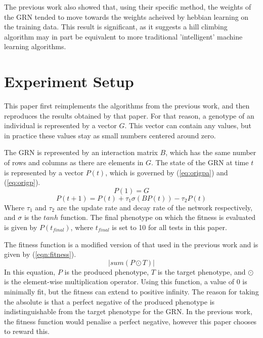 \documentclass[twocolumn,a4paper]{article}
\begin{document}
    The previous work also showed that, using their specific method, the weights of the GRN tended to move towards the weights acheived by hebbian learning on the training data. This result is significant, as it suggests a hill climbing algorithm may in part be equivalent to more traditional 'intelligent' machine learning algorithms.

    \section{Experiment Setup}
    This paper first reimplements the algorithms from the previous work, and then reproduces the results obtained by that paper. For that reason, a genotype of an individual is represented by a vector $G$. This vector can contain any values, but in practice these values stay as small numbers centered around zero.
    
    The GRN is represented by an interaction matrix $B$, which has the same number of rows and columns as there are elements in $G$. The state of the GRN at time $t$ is represented by a vector $P(t)$, which is governed by (\ref{eq:origpa}) and (\ref{eq:origp}).
    \begin{equation} \label{eq:origpa}
        P(1) = G
    \end{equation}
    \begin{equation} \label{eq:origp}
        P(t+1) = P(t) + \tau_1 \sigma (B P(t)) - \tau_2 P(t)
    \end{equation}
    Where $\tau_1$ and $\tau_2$ are the update rate and decay rate of the network respectively, and $\sigma$ is the $tanh$ function. The final phenotype on which the fitness is evaluated is given by $P(t_{final})$, where $t_{final}$ is set to 10 for all tests in this paper.

    The fitness function is a modified version of that used in the previous work and is given by (\ref{eqn:fitness}).
    \begin{equation} \label{eqn:fitness}
        |{sum} (P \odot T)|
    \end{equation}
    In this equation, $P$ is the produced phenotype, $T$ is the target phenotype, and $\odot$ is the element-wise multiplication operator. Using this function, a value of 0 is minimally fit, but the fitness can extend to positive infinity. The reason for taking the absolute is that a perfect negative of the produced phenotype is indistinguishable from the target phenotype for the GRN. In the previous work, the fitness function would penalise a perfect negative, however this paper chooses to reward this.
\end{document}
